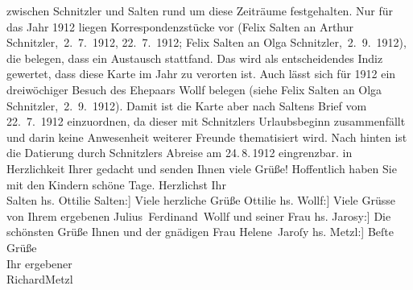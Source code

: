 \begin{ledgroupsized}[t]{13cm}
{{{                  zwischen Schnitzler und Salten rund um diese Zeiträume festgehalten. Nur für
                  das Jahr 1912 liegen Korrespondenzstücke vor (Felix Salten an Arthur Schnitzler, 2. 7. 1912, 22. 7. 1912; Felix Salten an Olga Schnitzler, 2. 9. 1912), die belegen, dass ein Austausch
                  stattfand. Das wird als entscheidendes Indiz gewertet, dass diese Karte im Jahr zu verorten ist. Auch lässt sich für 1912
                  ein dreiwöchiger Besuch des Ehepaars
                     Wollf belegen (siehe Felix Salten an Olga Schnitzler, 2. 9. 1912). Damit ist die Karte aber nach Saltens
                  Brief vom 22. 7. 1912
                  einzuordnen, da dieser mit Schnitzlers Urlaubsbeginn zusammenfällt und darin keine Anwesenheit weiterer Freunde thematisiert
                  wird. Nach hinten ist die Datierung durch Schnitzlers Abreise am 24. 8. 1912 eingrenzbar.}}}\label{K_L03575-1h} in Herzlichkeit
               Ihrer gedacht und senden Ihnen viele Grüße! Hoffentlich haben Sie mit den Kindern schöne Tage.
               Herzlichst Ihr {\\}\spacefill\mbox{Salten}\pend
           \pstart
           \noindent{}{[}hs. Ottilie Salten:{]} Viele herzliche Grüße \spacefill\mbox{Ottilie}\pend
           \pstart
           \noindent{}{[}hs. Wollf:{]} Viele Grüsse von Ihrem ergebenen\pend
           \pstart \spacefill\mbox{Julius Ferdinand Wollf} und seiner Frau\pend{}\pstart
           \noindent{}{[}hs. Jarosy:{]} Die schönsten Grüße Ihnen und der gnädigen Frau
                  \spacefill\mbox{Helene Jaroſy}\pend
           \pstart
           \noindent{}{[}hs. Metzl:{]} Beſte Grüße {\\}Ihr ergebener {\\}\spacefill\mbox{RichardMetzl}\pend
           

\end{ledgroupsized}
